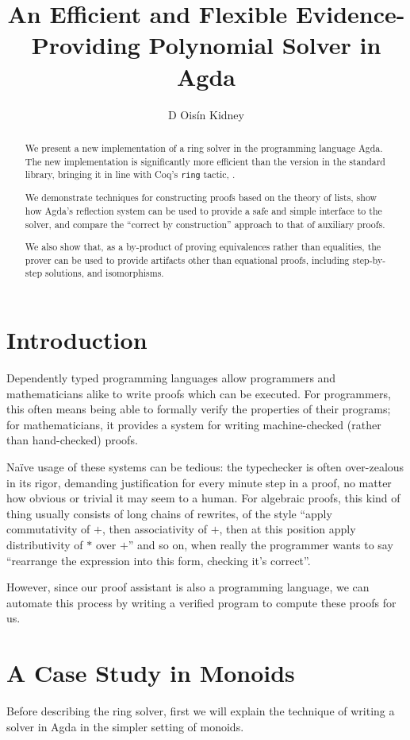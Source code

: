 \documentclass[draft, twocolumn]{article}
\author{D Oisín Kidney}
\title{An Efficient and Flexible Evidence-Providing Polynomial Solver in Agda}
\theoremstyle{definition}
\theoremstyle{remark}
\begin{document}
\maketitle
\begin{abstract}
  We present a new implementation of a ring solver in the programming language
  Agda\cite{norell_dependently_2008}. The new implementation is significantly
  more efficient than the version in the standard
  library\cite{danielsson_agda_2018}, bringing it in line with Coq's \verb+ring+
  tactic\cite{the_coq_development_team_2018_1219885},
  \cite{hutchison_proving_2005}. 

  We demonstrate techniques for constructing proofs based on the theory of
  lists, show how Agda's reflection system can be used to provide a safe and
  simple interface to the solver, and compare the ``correct by construction''
  approach to that of auxiliary proofs.
  
  We also show that, as a by-product of proving equivalences rather than
  equalities, the prover can be used to provide artifacts other than equational
  proofs, including step-by-step solutions, and isomorphisms.
\end{abstract}
\tableofcontents
\section{Introduction}
Dependently typed programming languages allow programmers and mathematicians
alike to write proofs which can be executed. For programmers, this often means
being able to formally verify the properties of their programs; for
mathematicians, it provides a system for writing machine-checked (rather than
hand-checked) proofs.

Naïve usage of these systems can be tedious: the typechecker is often
over-zealous in its rigor, demanding justification for every minute step in a
proof, no matter how obvious or trivial it may seem to a human. For algebraic
proofs, this kind of thing usually consists of long chains of rewrites, of the
style ``apply commutativity of \(+\), then associativity of \(+\), then at this
position apply distributivity of \(*\) over \(+\)'' and so on, when really the
programmer wants to say ``rearrange the expression into this form, checking it's
correct''.

However, since our proof assistant is also a programming language, we can
automate this process by writing a verified program to compute these proofs for
us. 
\section{A Case Study in Monoids}
Before describing the ring solver, first we will explain the technique of
writing a solver in Agda in the simpler setting of monoids.
\end{document}
